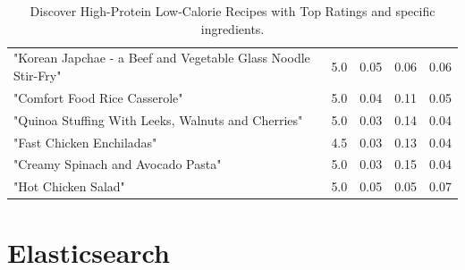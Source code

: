 \begin{enumerate}
\begin{table}[h!]
\begin{tabularx}{\textwidth}{>{\raggedright\arraybackslash}Xcccc}
"Korean Japchae - a Beef and Vegetable Glass Noodle Stir-Fry" & 5.0  & 0.05 & 0.06 & 0.06 \\
"Comfort Food Rice Casserole"                       & 5.0  & 0.04 & 0.11 & 0.05 \\
"Quinoa Stuffing With Leeks, Walnuts and Cherries" & 5.0  & 0.03 & 0.14 & 0.04 \\
"Fast Chicken Enchiladas"                           & 4.5  & 0.03 & 0.13 & 0.04 \\
"Creamy Spinach and Avocado Pasta"                 & 5.0  & 0.03 & 0.15 & 0.04 \\
"Hot Chicken Salad"                                & 5.0  & 0.05 & 0.05 & 0.07 \\

\bottomrule
\end{tabularx}
\caption{Discover High-Protein Low-Calorie Recipes with Top Ratings and specific ingredients.}
\label{tab:recipe_data}
\end{table}

\end{enumerate}
\clearpage
\section{Elasticsearch}

